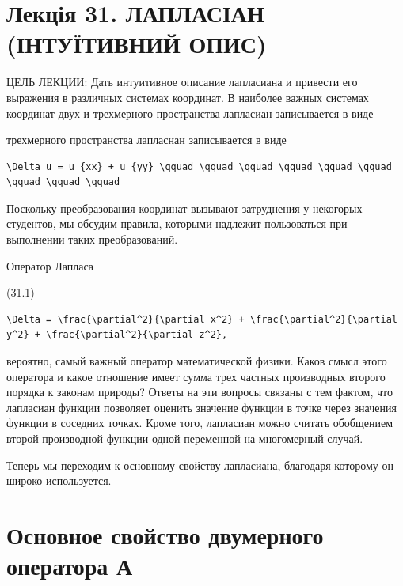 \documentclass[
  ukrainian,
]{article}
\begin{document}
\section{Лекція 31. ЛАПЛАСІАН (ІНТУЇТИВНИЙ
ОПИС)}\label{ux43bux435ux43aux446ux456ux44f-31.-ux43bux430ux43fux43bux430ux441ux456ux430ux43d-ux456ux43dux442ux443ux457ux442ux438ux432ux43dux438ux439-ux43eux43fux438ux441}

ЦЕЛЬ ЛЕКЦИИ: Дать интуитивное описание лапласиана и привести его
выражения в различных системах координат. В наиболее важных системах
координат двух-и трехмерного пространства лапласиан записывается в виде

трехмерного пространства лапласнан записывается в виде

\begin{verbatim}
\Delta u = u_{xx} + u_{yy} \qquad \qquad \qquad \qquad \qquad \qquad \qquad \qquad \qquad
\end{verbatim}

Поскольку преобразования координат вызывают затруднения у некогорых
студентов, мы обсудим правила, которыми надлежит пользоваться при
выполнении таких преобразований.

Оператор Лапласа

(31.1)

\begin{verbatim}
\Delta = \frac{\partial^2}{\partial x^2} + \frac{\partial^2}{\partial y^2} + \frac{\partial^2}{\partial z^2},
\end{verbatim}

вероятно, самый важный оператор математической физики. Каков смысл этого
оператора и какое отношение имеет сумма трех частных производных второго
порядка к законам природы? Ответы на эти вопросы связаны с тем фактом,
что лапласиан функции позволяет оценить значение функции в точке через
значения функции в соседних точках. Кроме того, лапласиан можно считать
обобщением второй производной функции одной переменной на многомерный
случай.

Теперь мы переходим к основному свойству лапласиана, благодаря которому
он широко используется.

\section{Основное свойство двумерного оператора
А}\label{ux43eux441ux43dux43eux432ux43dux43eux435-ux441ux432ux43eux439ux441ux442ux432ux43e-ux434ux432ux443ux43cux435ux440ux43dux43eux433ux43e-ux43eux43fux435ux440ux430ux442ux43eux440ux430-ux430}
\end{document}
